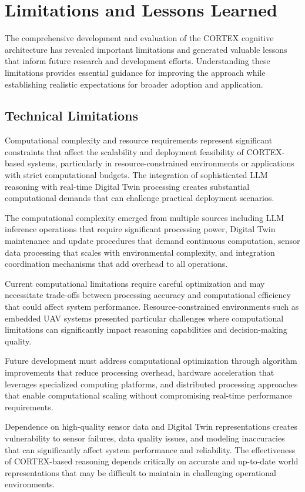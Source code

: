 \section{Limitations and Lessons Learned}

The comprehensive development and evaluation of the CORTEX cognitive architecture has revealed important limitations and generated valuable lessons that inform future research and development efforts. Understanding these limitations provides essential guidance for improving the approach while establishing realistic expectations for broader adoption and application.

\subsection{Technical Limitations}

Computational complexity and resource requirements represent significant constraints that affect the scalability and deployment feasibility of CORTEX-based systems, particularly in resource-constrained environments or applications with strict computational budgets. The integration of sophisticated LLM reasoning with real-time Digital Twin processing creates substantial computational demands that can challenge practical deployment scenarios.

The computational complexity emerged from multiple sources including LLM inference operations that require significant processing power, Digital Twin maintenance and update procedures that demand continuous computation, sensor data processing that scales with environmental complexity, and integration coordination mechanisms that add overhead to all operations.

Current computational limitations require careful optimization and may necessitate trade-offs between processing accuracy and computational efficiency that could affect system performance. Resource-constrained environments such as embedded UAV systems presented particular challenges where computational limitations can significantly impact reasoning capabilities and decision-making quality.

Future development must address computational optimization through algorithm improvements that reduce processing overhead, hardware acceleration that leverages specialized computing platforms, and distributed processing approaches that enable computational scaling without compromising real-time performance requirements.

Dependence on high-quality sensor data and Digital Twin representations creates vulnerability to sensor failures, data quality issues, and modeling inaccuracies that can significantly affect system performance and reliability. The effectiveness of CORTEX-based reasoning depends critically on accurate and up-to-date world representations that may be difficult to maintain in challenging operational environments.

